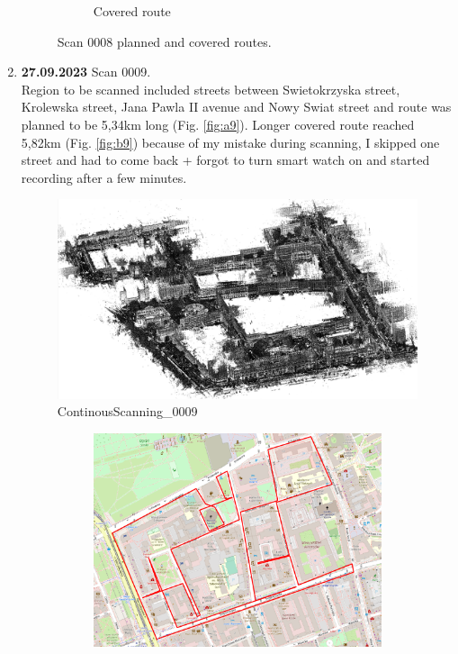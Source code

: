 \documentclass[a4paper,12pt]{book}
\begin{document}
\begin{enumerate}
\begin{figure}[H]
\begin{subfigure}{.83\textwidth}
			\caption{Covered route}
			\label{fig:b8}
		\end{subfigure}
		\caption{Scan 0008 planned and covered routes.}
		\label{fig:fig8}
	\end{figure} 
	\item \textbf{27.09.2023} Scan 0009. \\
	Region to be scanned included streets between Swietokrzyska street, Krolewska street, Jana Pawla II avenue and Nowy Swiat street and route was planned to be 5,34km long (Fig. \ref{fig:a9}). Longer covered route reached 5,82km (Fig. \ref{fig:b9}) because of my mistake during scanning, I skipped one street and had to come back + forgot to turn smart watch on and started recording after a few minutes.
	\begin{figure}[H]
		\includegraphics[width=1\linewidth]{cloud9}
		\caption{ContinousScanning\_0009}
	\end{figure}
	\begin{figure}[H]
		\centering
		\begin{subfigure}{.93\textwidth}
			\centering
			\includegraphics[width=1\linewidth]{route_p9}

\end{subfigure}
\end{figure}
\end{enumerate}
\end{document}
